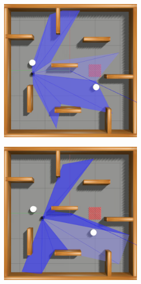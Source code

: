 \begin{figure}[H]
\begin{center}
\begin{subfigure}[b]{0.60\textwidth}
\begin{subfigure}[b]{0.24\textwidth}
            \includegraphics[width=\textwidth]{imagens/simulated_envs/sim_env3_sac/2.png}
        \end{subfigure}
        \hfill
        \begin{subfigure}[b]{0.24\textwidth}
            \includegraphics[width=\textwidth]{imagens/simulated_envs/sim_env3_sac/3.png}

\end{subfigure}
\end{subfigure}
\end{center}
\end{figure}
